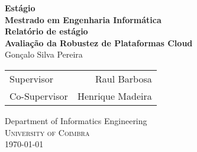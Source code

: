 \begin{titlepage}

\begin{center}

\textup{\small {\bf Estágio}}\\[0.3in]

\small{\bf Mestrado em Engenharia Informática}\\[1.3in]

\Large \textbf {Relatório de estágio}\\[0.2in]
\textbf{Avaliação da Robustez de Plataformas Cloud}\\[1.5in]

\Large{Gonçalo Silva Pereira}\\
\vspace{0.5cm}

\normalsize 
\begin{table}[h]
\centering
\begin{tabular}{lr}\hline
Supervisor     &  Raul Barbosa\\
Co-Supervisor  &  Henrique Madeira\\ \hline
\end{tabular}
\end{table}

\vspace{3cm}
\Large{Department of Informatics Engineering}\\
\normalsize
\textsc{University of Coimbra}
\vspace{0.2cm}\\


\dateenglish
\today

\end{center}
\end{titlepage}

